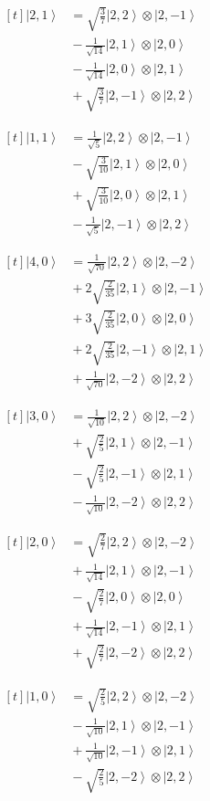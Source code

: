 \documentclass[11pt,a4paper]{article}
\newcommand{\estadocelda}[1]{%
  \begin{minipage}[t]{0.48\linewidth}
  \small\raggedright
  \(\displaystyle\begin{aligned}[t]#1\end{aligned}\)
  \end{minipage}%
}
\newcommand{\ket}[1]{\left|#1\right\rangle}
\begin{document}
\noindent\estadocelda{
\ket{2,1} &= \sqrt{\frac{3}{7}}\ket{2,2}\otimes\ket{2,-1} \\
 &{}-\frac{1}{\sqrt{14}}\ket{2,1}\otimes\ket{2,0} \\
 &{}-\frac{1}{\sqrt{14}}\ket{2,0}\otimes\ket{2,1} \\
 &{}+\sqrt{\frac{3}{7}}\ket{2,-1}\otimes\ket{2,2}
}\hfill\estadocelda{
\ket{1,1} &= \frac{1}{\sqrt{5}}\ket{2,2}\otimes\ket{2,-1} \\
 &{}-\sqrt{\frac{3}{10}}\ket{2,1}\otimes\ket{2,0} \\
 &{}+\sqrt{\frac{3}{10}}\ket{2,0}\otimes\ket{2,1} \\
 &{}-\frac{1}{\sqrt{5}}\ket{2,-1}\otimes\ket{2,2}
}\par\addvspace{1.4em}

\noindent\estadocelda{
\ket{4,0} &= \frac{1}{\sqrt{70}}\ket{2,2}\otimes\ket{2,-2} \\
 &{}+2\sqrt{\frac{2}{35}}\ket{2,1}\otimes\ket{2,-1} \\
 &{}+3\sqrt{\frac{2}{35}}\ket{2,0}\otimes\ket{2,0} \\
 &{}+2\sqrt{\frac{2}{35}}\ket{2,-1}\otimes\ket{2,1} \\
 &{}+\frac{1}{\sqrt{70}}\ket{2,-2}\otimes\ket{2,2}
}\hfill\estadocelda{
\ket{3,0} &= \frac{1}{\sqrt{10}}\ket{2,2}\otimes\ket{2,-2} \\
 &{}+\sqrt{\frac{2}{5}}\ket{2,1}\otimes\ket{2,-1} \\
 &{}-\sqrt{\frac{2}{5}}\ket{2,-1}\otimes\ket{2,1} \\
 &{}-\frac{1}{\sqrt{10}}\ket{2,-2}\otimes\ket{2,2}
}\par\addvspace{1.4em}

\noindent\estadocelda{
\ket{2,0} &= \sqrt{\frac{2}{7}}\ket{2,2}\otimes\ket{2,-2} \\
 &{}+\frac{1}{\sqrt{14}}\ket{2,1}\otimes\ket{2,-1} \\
 &{}-\sqrt{\frac{2}{7}}\ket{2,0}\otimes\ket{2,0} \\
 &{}+\frac{1}{\sqrt{14}}\ket{2,-1}\otimes\ket{2,1} \\
 &{}+\sqrt{\frac{2}{7}}\ket{2,-2}\otimes\ket{2,2}
}\hfill\estadocelda{
\ket{1,0} &= \sqrt{\frac{2}{5}}\ket{2,2}\otimes\ket{2,-2} \\
 &{}-\frac{1}{\sqrt{10}}\ket{2,1}\otimes\ket{2,-1} \\
 &{}+\frac{1}{\sqrt{10}}\ket{2,-1}\otimes\ket{2,1} \\
 &{}-\sqrt{\frac{2}{5}}\ket{2,-2}\otimes\ket{2,2}
}\par\addvspace{1.4em}
\end{document}
